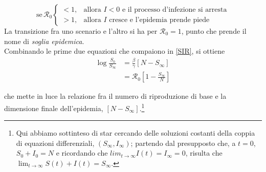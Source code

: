 \[
\text{se} \,\mathcal{R}_0
\begin{cases}
< 1, & \text{allora $I < 0$ e il processo d'infezione si arresta}\\
> 1, & \text{allora $I$ cresce e l'epidemia prende piede}
\end{cases}
\]
La transizione fra uno scenario e l'altro si ha per $\mathcal{R}_0 = 1$, punto che prende il nome di \emph{soglia epidemica}. \\ Combinando le prime due equazioni \cite{Brauer} che compaiono in \eqref{SIR}, si ottiene
\[
\begin{split}
\log \frac{S_0}{S_\infty} &= \frac{\beta}{\gamma} \left[ N - S_\infty \right ] \\
						  &= \mathcal{R}_0 \left[1 - \frac{S_\infty}{N} \right ]
\end{split}
\] 

che mette in luce la relazione fra il numero di riproduzione di base e la dimensione finale dell'epidemia, $\left[ N - S_\infty \right ] $.\footnote{Qui abbiamo sottinteso di star cercando delle soluzioni costanti della coppia di equazioni differenziali, $ \left( S_\infty, I_\infty \right ) $; partendo dal presupposto che, a $ t = 0 $, $ S_0 + I_0 = N $ e ricordando che $ lim_{t\to \infty} I(t) = I_\infty = 0 $, risulta che $ \lim_{t\to \infty} S(t) + I(t) = S_\infty $.}